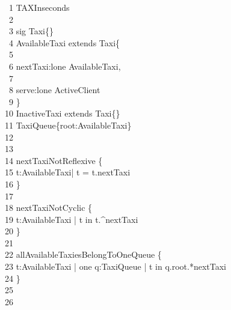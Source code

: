 \-     \ \ 1	 TAXInseconds\\
\-     \ \ 2	\\
\-     \ \ 3	 {\color{blue}sig} Taxi\{\}\\
\-     \ \ 4	 AvailableTaxi {\color{blue}extends} Taxi\{\\
\-     \ \ 5	\qquad \-\\
\-     \ \ 6	\qquad \-\qquad nextTaxi:lone AvailableTaxi, \\
\-     \ \ 7	\qquad \-\\
\-     \ \ 8	\qquad \-\qquad serve:lone ActiveClient\\
\-     \ \ 9	\qquad \}\\
\-    \ 10	 InactiveTaxi {\color{blue}extends} Taxi\{\}\\
\-    \ 11	 TaxiQueue\{root:AvailableTaxi\}\\
\-    \ 12	\qquad \\
\-    \ 13	\\
\-    \ 14	 nextTaxiNotReflexive \{ \\
\-    \ 15	\qquad \- t:AvailableTaxi| t = t.nextTaxi \\
\-    \ 16	\qquad \}\\
\-    \ 17	\\
\-    \ 18	 nextTaxiNotCyclic \{\\
\-    \ 19	\qquad \- t:AvailableTaxi | t {\color{blue}in} t.\string^nextTaxi\\
\-    \ 20	\qquad \} \\
\-    \ 21	\\
\-    \ 22	 allAvailableTaxiesBelongToOneQueue \{\\
\-    \ 23	\qquad \- t:AvailableTaxi | {\color{blue}one} q:TaxiQueue | t {\color{blue}in} q.root.*nextTaxi\\
\-    \ 24	\qquad \}\\
\-    \ 25	\qquad \\
\-    \ 26	\\
